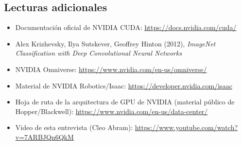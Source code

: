 \documentclass[a4paper]{article}
\begin{document}
\subsection{Lecturas adicionales}
\begin{itemize}
    \item Documentación oficial de NVIDIA CUDA: \url{https://docs.nvidia.com/cuda/}
    \item Alex Krizhevsky, Ilya Sutskever, Geoffrey Hinton (2012), \textit{ImageNet Classification with Deep Convolutional Neural Networks}
    \item NVIDIA Omniverse: \url{https://www.nvidia.com/en-us/omniverse/}
    \item Material de NVIDIA Robotics/Isaac: \url{https://developer.nvidia.com/isaac}
    \item Hoja de ruta de la arquitectura de GPU de NVIDIA (material público de Hopper/Blackwell): \url{https://www.nvidia.com/en-us/data-center/}
    \item Video de esta entrevista (Cleo Abram): \url{https://www.youtube.com/watch?v=7ARBJQn6QkM}
\end{itemize}

\end{document}
